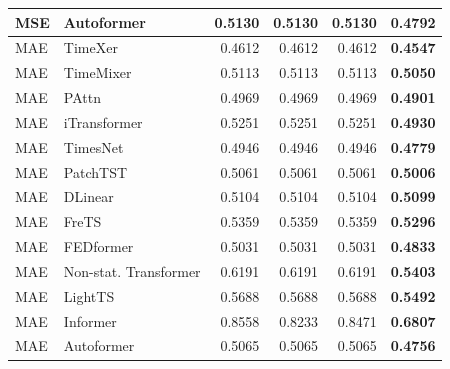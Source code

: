 \begin{longtable}{llrrrr}
MSE & Autoformer & 0.5130 & 0.5130 & 0.5130 & \textbf{0.4792} \\
\midrule
MAE & TimeXer & 0.4612 & 0.4612 & 0.4612 & \textbf{0.4547} \\
MAE & TimeMixer & 0.5113 & 0.5113 & 0.5113 & \textbf{0.5050} \\
MAE & PAttn & 0.4969 & 0.4969 & 0.4969 & \textbf{0.4901} \\
MAE & iTransformer & 0.5251 & 0.5251 & 0.5251 & \textbf{0.4930} \\
MAE & TimesNet & 0.4946 & 0.4946 & 0.4946 & \textbf{0.4779} \\
MAE & PatchTST & 0.5061 & 0.5061 & 0.5061 & \textbf{0.5006} \\
MAE & DLinear & 0.5104 & 0.5104 & 0.5104 & \textbf{0.5099} \\
MAE & FreTS & 0.5359 & 0.5359 & 0.5359 & \textbf{0.5296} \\
MAE & FEDformer & 0.5031 & 0.5031 & 0.5031 & \textbf{0.4833} \\
MAE & Non-stat. Transformer & 0.6191 & 0.6191 & 0.6191 & \textbf{0.5403} \\
MAE & LightTS & 0.5688 & 0.5688 & 0.5688 & \textbf{0.5492} \\
MAE & Informer & 0.8558 & 0.8233 & 0.8471 & \textbf{0.6807} \\
MAE & Autoformer & 0.5065 & 0.5065 & 0.5065 & \textbf{0.4756} \\
\end{longtable}
\endgroup

